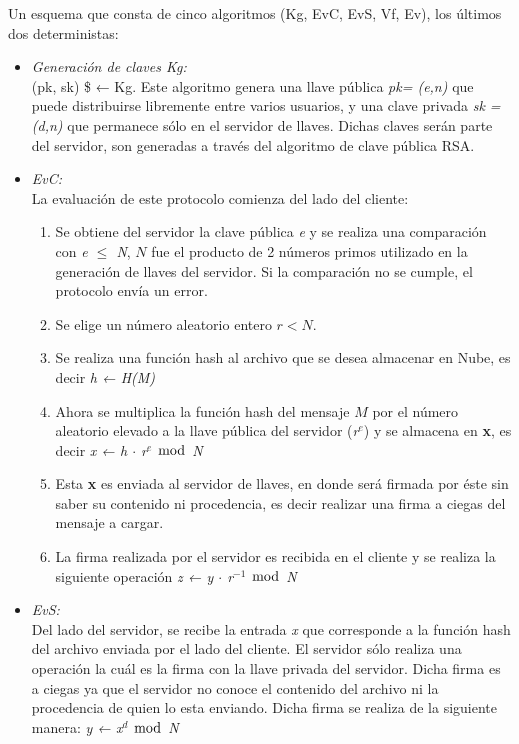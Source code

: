 Un esquema que consta de cinco algoritmos (Kg, EvC, EvS, Vf, Ev), los últimos dos deterministas: 

\begin{itemize}
	\item \textit{Generación de claves Kg: } \\
	 (pk, sk) \$ ← Kg. Este algoritmo genera una llave pública \textit{pk= (e,n)} que puede distribuirse libremente entre varios usuarios, y una clave privada \textit{sk = (d,n)} que permanece sólo en el servidor de llaves. Dichas claves serán parte del servidor, son generadas a través del algoritmo de clave pública RSA.


	\item \textit{EvC: }\\ 
	La evaluación de este protocolo comienza del lado del cliente: 
	\begin {enumerate}
		\item Se obtiene del servidor la clave pública \textit{e} y se realiza una comparación con  \textit{e $\leq$ N}, $N$ fue el producto de 2 números primos utilizado en la generación de llaves del servidor. Si la comparación no se cumple, el protocolo envía un error.
		\item Se elige un número aleatorio entero $r<N$.
		\item Se realiza una función hash al archivo que se desea almacenar en Nube, es decir \textit{h ← H(M)} 
		\item Ahora se multiplica la función hash del mensaje $M$ por el número aleatorio elevado a la llave pública del servidor (\textit{r$^e$}) y se almacena en \textbf{x}, es decir \textit{x ← h $\cdot$ r$^e$ $\bmod$ N}
		\item Esta \textbf{x} es enviada al servidor de llaves, en donde será firmada por éste sin saber su contenido ni procedencia, es decir realizar una firma a ciegas del mensaje a cargar.
		\item La firma realizada por el servidor es recibida en el cliente y se realiza la siguiente operación  \hspace{2cm} \textit{z ← y $\cdot$ r$^{-1}$ $\bmod$ N}


\end{enumerate}
\item \textit{EvS: }\\ 
Del lado del servidor, se recibe la entrada \textit{x} que corresponde a la función hash del archivo enviada por el lado del cliente. El servidor sólo realiza una operación la cuál es la firma con la llave privada del servidor. Dicha firma es a ciegas ya que el servidor no conoce el contenido del archivo ni la procedencia de quien lo esta enviando. Dicha firma se realiza de la siguiente manera:    \hspace{2cm} \textit{y ← x$^d$ $\bmod$ N}



\end{itemize}
